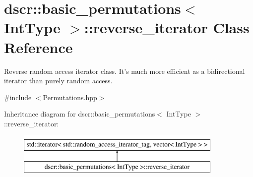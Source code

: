 \hypertarget{classdscr_1_1basic__permutations_1_1reverse__iterator}{\section{dscr\-:\-:basic\-\_\-permutations$<$ Int\-Type $>$\-:\-:reverse\-\_\-iterator Class Reference}
\label{classdscr_1_1basic__permutations_1_1reverse__iterator}
}


Reverse random access iterator class. It's much more efficient as a bidirectional iterator than purely random access.  




{\ttfamily \#include $<$Permutations.\-hpp$>$}

Inheritance diagram for dscr\-:\-:basic\-\_\-permutations$<$ Int\-Type $>$\-:\-:reverse\-\_\-iterator\-:\begin{figure}[H]
\begin{center}
\leavevmode
\includegraphics[height=2.000000cm]{classdscr_1_1basic__permutations_1_1reverse__iterator}
\end{center}
\end{figure}
